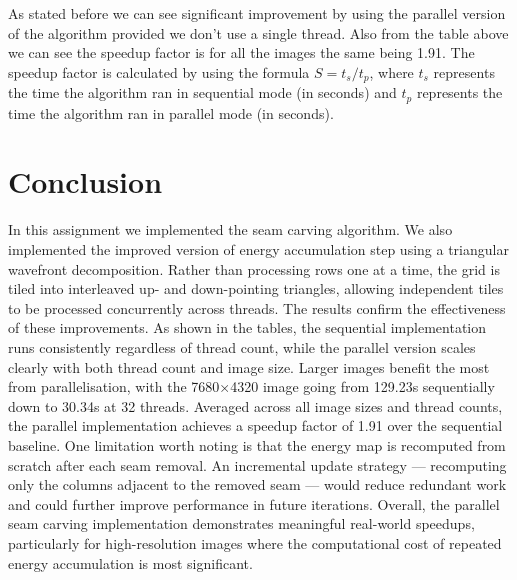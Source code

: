 \documentclass[9pt,onecolumn]{IEEEtran}
\begin{document}
As stated before we can see significant improvement by using the parallel version of the algorithm provided we don't use a single thread. Also from the table above we can see the speedup factor is for all the images the same being 1.91. The speedup factor is calculated by using the formula $S = t_s/t_p$, where $t_s$ represents the time the algorithm ran in sequential mode (in seconds) and $t_p$ represents the time the algorithm ran in parallel mode (in seconds).
\section{\textbf{Conclusion}}
In this assignment we implemented the seam carving algorithm. We also implemented the improved version of energy accumulation step using a triangular wavefront decomposition. Rather than processing rows one at a time, the grid is tiled into interleaved up- and down-pointing triangles, allowing independent tiles to be processed concurrently across threads. The results confirm the effectiveness of these improvements. As shown in the tables, the sequential implementation runs consistently regardless of thread count, while the parallel version scales clearly with both thread count and image size. Larger images benefit the most from parallelisation, with the 7680×4320 image going from 129.23s sequentially down to 30.34s at 32 threads. Averaged across all image sizes and thread counts, the parallel implementation achieves a speedup factor of 1.91 over the sequential baseline.
One limitation worth noting is that the energy map is recomputed from scratch after each seam removal. An incremental update strategy — recomputing only the columns adjacent to the removed seam — would reduce redundant work and could further improve performance in future iterations.
Overall, the parallel seam carving implementation demonstrates meaningful real-world speedups, particularly for high-resolution images where the computational cost of repeated energy accumulation is most significant.




\end{document}
